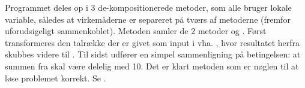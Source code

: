 Programmet deles op i 3 de-kompositionerede metoder, som alle bruger lokale variable, således at virkemåderne er separeret på tværs af metoderne (fremfor uforudsigeligt sammenkoblet). Metoden  samler de 2 metoder  og . Først transformeres den talrække der er givet som input i  vha. , hvor resultatet herfra skubbes videre til . Til sidst udfører  en simpel sammenligning på betingelsen: at summen fra  skal være delelig med 10. Det er klart metoden  som er nøglen til at løse problemet korrekt. Se .
